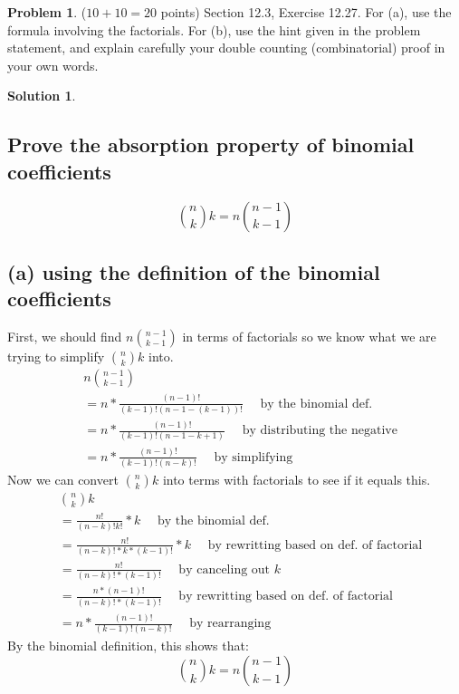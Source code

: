 \documentclass{article}
\theoremstyle{definition}
\newtheorem{problem}{Problem}
\newtheorem*{solution}{Solution}
\begin{document}
\newpage
\begin{problem} ($10+10=20$ points) Section 12.3, Exercise 12.27.
For (a), use the formula involving the factorials.  For (b), use the hint given in the
problem statement, and explain carefully your double counting (combinatorial) 
proof in your own words.
\end{problem}
\begin{solution}
\hspace{1cm}
\subsection*{Prove the absorption property of binomial coefficients}
$$ \binom{n}{k}k = n \binom{n-1}{k-1} $$
\subsection*{(a) using the definition of the binomial coefficients}
First, we should find $ n \binom{n-1}{k-1}$ in terms of factorials so we know what we are trying to simplify $ \binom{n}{k}k $ into.
\begin{align*}
&n \binom{n-1}{k-1}\\
&=n * \frac{(n-1)!}{(k-1)!(n-1 - (k-1))!}\quad \mbox{ by the binomial def.} \\
&= n * \frac{(n-1)!}{(k-1)!(n-1 - k + 1)} \quad \mbox{ by distributing the negative}\\
&= n * \frac{(n-1)!}{(k-1)!(n-k)!} \quad \mbox{ by simplifying}
\end{align*}
Now we can convert $ \binom{n}{k}k $ into terms with factorials to see if it equals this.
\begin{align*}
&\binom{n}{k}k\\
&=\frac{n!}{(n-k)!k!}*k \quad \mbox{ by the binomial def.}\\
&=\frac{n!}{(n-k)!*k*(k-1)!}*k \quad \mbox { by rewritting based on def. of factorial}\\
&=\frac{n!}{(n-k)!*(k-1)!} \quad \mbox{ by canceling out $k$}\\
&=\frac{n * (n-1)!}{(n-k)!*(k-1)!} \quad \mbox{ by rewritting based on def. of factorial}\\
&= n * \frac{(n-1)!}{(k-1)!(n-k)!} \quad \mbox{ by rearranging}
\end{align*}
By the binomial definition, this shows that:
$$ \binom{n}{k}k = n \binom{n-1}{k-1} $$

\end{solution}
\end{document}
